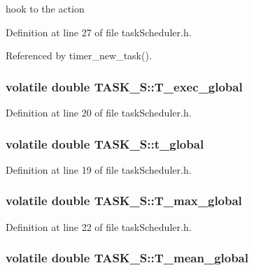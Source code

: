 hook to the action 



Definition at line 27 of file task\-Scheduler.\-h.



Referenced by timer\-\_\-new\-\_\-task().

\hypertarget{structTASK__S_ae06b712fd9963cff8192e9ef3140bc6d}{
\subsubsection[{T\-\_\-exec\-\_\-global}]{\setlength{\rightskip}{0pt plus 5cm}volatile double T\-A\-S\-K\-\_\-\-S\-::\-T\-\_\-exec\-\_\-global}}\label{structTASK__S_ae06b712fd9963cff8192e9ef3140bc6d}


Definition at line 20 of file task\-Scheduler.\-h.

\hypertarget{structTASK__S_a29a175bdd4b9f880a2b69bb5186e3c7e}{
\subsubsection[{t\-\_\-global}]{\setlength{\rightskip}{0pt plus 5cm}volatile double T\-A\-S\-K\-\_\-\-S\-::t\-\_\-global}}\label{structTASK__S_a29a175bdd4b9f880a2b69bb5186e3c7e}


Definition at line 19 of file task\-Scheduler.\-h.

\hypertarget{structTASK__S_a430c874cbf361b6dbc75ad1540880948}{
\subsubsection[{T\-\_\-max\-\_\-global}]{\setlength{\rightskip}{0pt plus 5cm}volatile double T\-A\-S\-K\-\_\-\-S\-::\-T\-\_\-max\-\_\-global}}\label{structTASK__S_a430c874cbf361b6dbc75ad1540880948}


Definition at line 22 of file task\-Scheduler.\-h.

\hypertarget{structTASK__S_a9ebae87e1b64869f328a47473f2ea7d7}{
\subsubsection[{T\-\_\-mean\-\_\-global}]{\setlength{\rightskip}{0pt plus 5cm}volatile double T\-A\-S\-K\-\_\-\-S\-::\-T\-\_\-mean\-\_\-global}}\label{structTASK__S_a9ebae87e1b64869f328a47473f2ea7d7}


